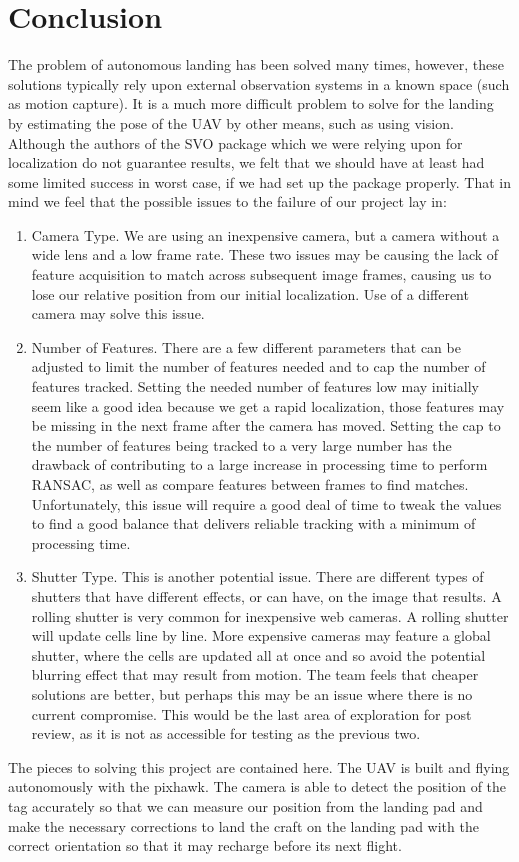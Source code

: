 \section{Conclusion}
The problem of autonomous landing has been solved many times, however, these solutions typically rely upon external observation systems in a known space (such as motion capture). It is a much more difficult problem to solve for the landing by estimating the pose of the UAV by other means, such as using vision. Although the authors of the SVO package which we were relying upon for localization do not guarantee results, we felt that we should have at least had some limited success in worst case, if we had set up the package properly. That in mind we feel that the possible issues to the failure of our project lay in:
\begin{enumerate}
\item Camera Type. We are using an inexpensive camera, but a camera without a wide lens and a low frame rate. These two issues may be causing the lack of feature acquisition to match across subsequent image frames, causing us to lose our relative position from our initial localization. Use of a different camera may solve this issue.
\item Number of Features. There are a few different parameters that can be adjusted to limit the number of features needed and to cap the number of features tracked. Setting the needed number of features low may initially seem like a good idea because we get a rapid localization, those features may be missing in the next frame after the camera has moved. Setting the cap to the number of features being tracked to a very large number has the drawback of contributing to a large increase in processing time to perform RANSAC, as well as compare features between frames to find matches. Unfortunately, this issue will require a good deal of time to tweak the values to find a good balance that delivers reliable tracking with a minimum of processing time.
\item Shutter Type. This is another potential issue. There are different types of shutters that have different effects, or can have, on the image that results. A rolling shutter is very common for inexpensive web cameras. A rolling shutter will update cells line by line. More expensive cameras may feature a global shutter, where the cells are updated all at once and so avoid the potential blurring effect that may result from motion. The team feels that cheaper solutions are better, but perhaps this may be an issue where there is no current compromise. This would be the last area of exploration for post review, as it is not as accessible for testing as the previous two.
\end{enumerate}
The pieces to solving this project are contained here. The UAV is built and flying autonomously with the pixhawk. The camera is able to detect the position of the tag accurately so that we can measure our position from the landing pad and make the necessary corrections to land the craft on the landing pad with the correct orientation so that it may recharge before its next flight.\\



